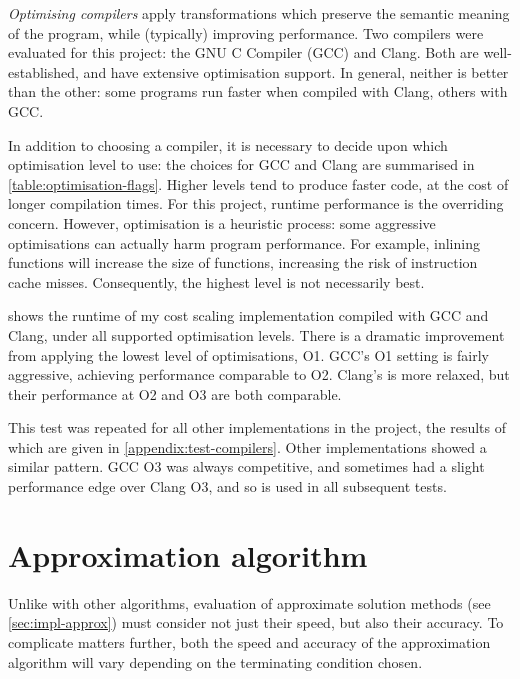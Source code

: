 \emph{Optimising compilers} apply transformations which preserve the semantic meaning of the program, while (typically) improving performance. Two compilers were evaluated for this project: the GNU C Compiler (GCC) and Clang. Both are well-established, and have extensive optimisation support. In general, neither is better than the other: some programs run faster when compiled with Clang, others with GCC.

In addition to choosing a compiler, it is necessary to decide upon which optimisation level to use: the choices for GCC and Clang are summarised in \cref{table:optimisation-flags}. Higher levels tend to produce faster code, at the cost of longer compilation times. For this project, runtime performance is the overriding concern. However, optimisation is a heuristic process: some aggressive optimisations can actually harm program performance. For example, inlining functions will increase the size of functions, increasing the risk of instruction cache misses. Consequently, the highest level is not necessarily best.

 shows the runtime of my cost scaling implementation compiled with GCC and Clang, under all supported optimisation levels. There is a dramatic improvement from applying the lowest level of optimisations, O1. GCC's O1 setting is fairly aggressive, achieving performance comparable to O2. Clang's is more relaxed, but their performance at O2 and O3 are both comparable.

This test was repeated for all other implementations in the project, the results of which are given in \cref{appendix:test-compilers}. Other implementations showed a similar pattern\footnotemark. GCC O3 was always competitive, and sometimes had a slight performance edge over Clang O3, and so is used in all subsequent tests.

\section{Approximation algorithm} \label{sec:eval-approx}

Unlike with other algorithms, evaluation of approximate solution methods (see \cref{sec:impl-approx}) must consider not just their speed, but also their accuracy. To complicate matters further, both the speed and accuracy of the approximation algorithm will vary depending on the terminating condition chosen.

